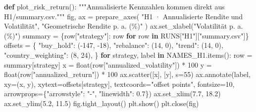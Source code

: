 \documentclass[
  ngerman,
  a4paper,
  DIV=11,
  oneside]{scrreprt}
\newenvironment{Shaded}{\begin{snugshade}}{\end{snugshade}}
\newcommand{\BuiltInTok}[1]{\textcolor[rgb]{0.00,0.23,0.31}{#1}}
\newcommand{\CommentTok}[1]{\textcolor[rgb]{0.37,0.37,0.37}{#1}}
\newcommand{\ControlFlowTok}[1]{\textcolor[rgb]{0.00,0.23,0.31}{\textbf{#1}}}
\newcommand{\DecValTok}[1]{\textcolor[rgb]{0.68,0.00,0.00}{#1}}
\newcommand{\FloatTok}[1]{\textcolor[rgb]{0.68,0.00,0.00}{#1}}
\newcommand{\KeywordTok}[1]{\textcolor[rgb]{0.00,0.23,0.31}{\textbf{#1}}}
\newcommand{\NormalTok}[1]{\textcolor[rgb]{0.00,0.23,0.31}{#1}}
\newcommand{\OperatorTok}[1]{\textcolor[rgb]{0.37,0.37,0.37}{#1}}
\newcommand{\StringTok}[1]{\textcolor[rgb]{0.13,0.47,0.30}{#1}}
\begin{document}
\begin{Shaded}
\begin{Highlighting}[]
\KeywordTok{def}\NormalTok{ plot\_risk\_return():}
    \CommentTok{"""Annualisierte Kennzahlen kommen direkt aus H1/summary.csv."""}
\NormalTok{    fig, ax }\OperatorTok{=}\NormalTok{ prepare\_axes(}
        \StringTok{"H1 · Annualisierte Rendite und Volatilität"}\NormalTok{, }\StringTok{"Geometrische Rendite p. a. (\%)"}
\NormalTok{    )}
\NormalTok{    ax.set\_xlabel(}\StringTok{"Volatilität p. a. (\%)"}\NormalTok{)}
\NormalTok{    summary }\OperatorTok{=}\NormalTok{ \{row[}\StringTok{"strategy"}\NormalTok{]: row }\ControlFlowTok{for}\NormalTok{ row }\KeywordTok{in}\NormalTok{ RUNS[}\StringTok{"H1"}\NormalTok{][}\StringTok{"summary.csv"}\NormalTok{]\}}
\NormalTok{    offsets }\OperatorTok{=}\NormalTok{ \{}
        \StringTok{"buy\_hold"}\NormalTok{: (}\OperatorTok{{-}}\DecValTok{147}\NormalTok{, }\OperatorTok{{-}}\DecValTok{18}\NormalTok{), }\StringTok{"rebalance"}\NormalTok{: (}\DecValTok{14}\NormalTok{, }\DecValTok{0}\NormalTok{),}
        \StringTok{"trend"}\NormalTok{: (}\DecValTok{14}\NormalTok{, }\DecValTok{0}\NormalTok{), }\StringTok{"country\_weighting"}\NormalTok{: (}\DecValTok{8}\NormalTok{, }\DecValTok{24}\NormalTok{),}
\NormalTok{    \}}
    \ControlFlowTok{for}\NormalTok{ strategy, label }\KeywordTok{in}\NormalTok{ NAMES\_H1.items():}
\NormalTok{        row }\OperatorTok{=}\NormalTok{ summary[strategy]}
\NormalTok{        x }\OperatorTok{=} \BuiltInTok{float}\NormalTok{(row[}\StringTok{"annualized\_volatility"}\NormalTok{]) }\OperatorTok{*} \DecValTok{100}
\NormalTok{        y }\OperatorTok{=} \BuiltInTok{float}\NormalTok{(row[}\StringTok{"annualized\_return"}\NormalTok{]) }\OperatorTok{*} \DecValTok{100}
\NormalTok{        ax.scatter([x], [y], s}\OperatorTok{=}\DecValTok{55}\NormalTok{)}
\NormalTok{        ax.annotate(label, xy}\OperatorTok{=}\NormalTok{(x, y), xytext}\OperatorTok{=}\NormalTok{offsets[strategy],}
\NormalTok{                    textcoords}\OperatorTok{=}\StringTok{"offset points"}\NormalTok{, fontsize}\OperatorTok{=}\DecValTok{10}\NormalTok{,}
\NormalTok{                    arrowprops}\OperatorTok{=}\NormalTok{\{}\StringTok{"arrowstyle"}\NormalTok{: }\StringTok{"{-}"}\NormalTok{, }\StringTok{"linewidth"}\NormalTok{: }\FloatTok{0.7}\NormalTok{\})}
\NormalTok{    ax.set\_xlim(}\FloatTok{7.7}\NormalTok{, }\FloatTok{18.2}\NormalTok{)}
\NormalTok{    ax.set\_ylim(}\FloatTok{5.2}\NormalTok{, }\FloatTok{11.5}\NormalTok{)}
\NormalTok{    fig.tight\_layout()}
\NormalTok{    plt.show()}
\NormalTok{    plt.close(fig)}



\end{Highlighting}
\end{Shaded}
\end{document}
